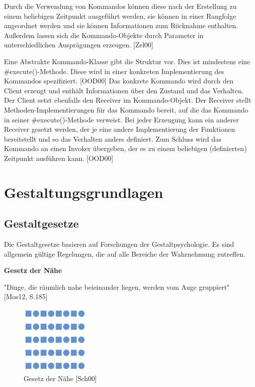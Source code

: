 Durch die Verwendung von Kommandos können diese nach der Erstellung zu einem beliebigen Zeitpunkt ausgeführt werden, sie können in einer Rangfolge angeordnet werden und sie können Informationen zum Rücknahme enthalten. Außerdem lassen sich die Kommando-Objekte durch Parameter in unterschiedlichen Ausprägungen erzeugen. [Zel00]

Eine Abstrakte Kommando-Klasse gibt die Struktur vor. Dies ist mindestens eine \#execute()-Methode. Diese wird in einer konkreten Implementierung des Kommandos spezifiziert. [OOD00]
Das konkrete Kommando wird durch den Client erzeugt und enthält Informationen über den Zustand und das Verhalten. Der Client setzt ebenfalls den Receiver im Kommando-Objekt. Der Receiver stellt Methoden-Implementierungen für das Kommando bereit, auf die das Kommando in seiner \#execute()-Methode verweist. Bei jeder Erzeugung kann ein anderer Receiver gesetzt werden, der je eine andere Implementierung der Funktionen bereitstellt und so das Verhalten anders definiert. Zum Schluss wird das Kommando an einen Invoker übergeben, der es zu einem beliebigen (definierten) Zeitpunkt ausführen kann. [OOD00]

\section{Gestaltungsgrundlagen} \label{sec:grundGestalt}
\subsection{Gestaltgesetze} \label{sec:gestaltGesetze}
Die Gestaltgesetze basieren auf Forschungen der Gestaltpsychologie. Es sind allgemein gültige Regelungen, die auf alle Bereiche der Wahrnehmung zutreffen.

\textbf{Gesetz der Nähe}

"Dinge, die räumlich nahe beieinander liegen, werden vom Auge gruppiert" [Mos12, S.185]

\begin{figure}[H]
 \centering
 \includegraphics[width=0.2999\textwidth]{grafiken/Gesetz_Naehe.png}
 \caption{Gesetz der Nähe [Sch00]}
 \label{fig:gesetz1}
\end{figure} 

